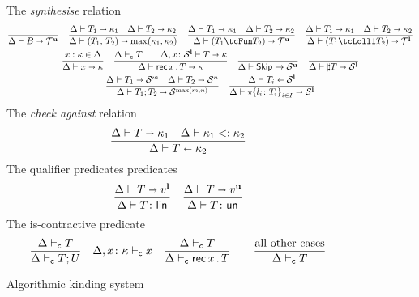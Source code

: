 \begin{figure}[h!]
  The \emph{synthesise} relation \hfill{}
  \begin{gather*}
    \frac{}{\algkindout{\tcBase}{\kindt^\Un}}
    \quad 
    \frac{
      \algkindout{T_1}{\kind_1}
      \quad
      \algkindout{T_2}{\kind_2}
    }{
      \algkindout{\tPair{T_1}{T_2}}{\max(\kind_1, \kind_2)}
    }
    \quad
    \frac{
      \algkindout{T_1}{\kind_1}
      \quad
      \algkindout{T_2}{\kind_2}
    }{
      \algkindout{(\tUnFun{T_1}{T_2})}{\kindt^\Un}
      }
    \quad
    \frac{
      \algkindout{T_1}{\kind_1}
      \quad
      \algkindout{T_2}{\kind_2}
    }{
      \algkindout{(\tLinFun{T_1}{T_2})}{\kindt^\Lin}
    }
    \\
    \frac{x : \kind \in \kindEnv}{\algkindout x \kind}
   \quad
   \frac{
     \contractive T
     \qquad
     \algkindout[\kindEnv, x\colon \kinds^\Lin] T \kind
   }{
     \algkindout{\tRec xT}{\kind}
   }
    \quad
    \frac{}{\kindEnv \Alg \tskip \rightarrow \kinds^\Un}
    \quad 
    \frac{}{\algkindout{\tMsg T}{\kinds^\Lin}}
    \\
    \frac{
      \algkindout{T_1}{\kinds^m}
      \quad
      \algkindout{T_2}{\kinds^n}
    }{
      \algkindout{\tSemi{T_1}{T_2}}{\kinds^{\max(m,n)}}
    }
    \quad
    \frac{
      \algkindin{T_i}{\kinds^\Lin}
    }{
      \algkindout{\tChoice{\{l_i\colon T_i\}}_{i\in I}}{\kinds^\Lin}
    }
  \end{gather*}
  The \emph{check against} relation\hfill{}
  \begin{equation*}
    \frac{
      \algkindout{T}{\kind_1}
      \quad
      \subkind{\kind_1}{\kind_2}
    }{
      \algkindin T {\kind_2}
    }
  \end{equation*}
  The qualifier predicates predicates \hfill{}\quad{}
  \begin{equation*}
    \frac{
      \algkindout T {v^\Lin}
    }{
      \isLin T
    }
    \quad
    \frac{
      \algkindout T {v^\Un}
    }{
      \isUn T
    }
  \end{equation*}
  The is-contractive predicate 
  \begin{equation*}
    \frac{
      \contractive{T}
    }{
      \contractive{T;U}
    }
    \quad
    \contractive[\kindEnv,x\colon\kind]{x}
    \quad 
    \frac{
      \contractive{T}
    }{
      \contractive{\tRecK xT}
    }
    \qquad
    \frac{\text{all other cases}}{\contractive{T}}
  \end{equation*}
  \caption{Algorithmic kinding system}
  \label{fig:kinding-system}
\end{figure}

